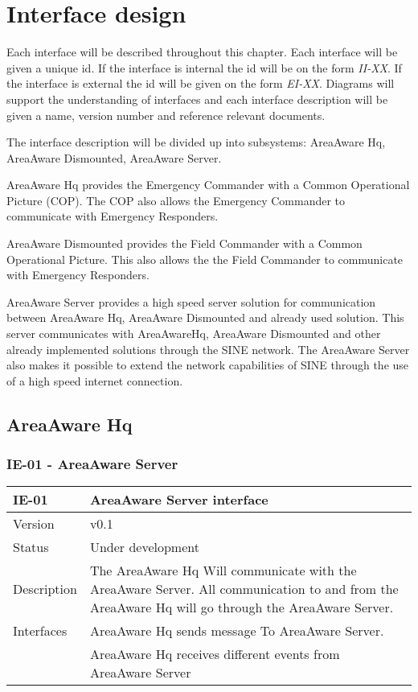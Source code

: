 \label{chp_interfaceDesign}
\chapter{Interface design}
Each interface will be described throughout this chapter. Each interface will be given a unique id. If the interface is internal the id will be on the form \emph{II-XX}. If the interface is external the id will be given on the form \emph{EI-XX}. Diagrams will support the understanding of interfaces and each interface description will be given a name, version number and reference relevant documents.

The interface description will be divided up into subsystems: AreaAware Hq, AreaAware Dismounted, AreaAware Server.

AreaAware Hq provides the Emergency Commander with a Common Operational Picture (COP). The COP also allows the Emergency Commander to communicate with Emergency Responders.

AreaAware Dismounted provides the Field Commander with a Common Operational Picture. This also allows the the Field Commander to communicate with Emergency Responders. 

AreaAware Server provides a high speed server solution for communication between AreaAware Hq, AreaAware Dismounted and already used solution. This server communicates with AreaAwareHq, AreaAware Dismounted and other already implemented solutions through the SINE network. The AreaAware Server also makes it possible to extend the network capabilities of SINE through the use of a high speed internet connection.


\section{AreaAware Hq}

\subsection{IE-01 - AreaAware Server}

\begin{longtable}{| p{3.5cm} |  p{10cm} | }
	\hline
	\textbf{IE-01} &  \textbf{AreaAware Server interface } \\
	\hline
	Version & v0.1 \\
	\hline
	Status & Under development \\
	\hline
	 Description & The AreaAware Hq Will communicate with the AreaAware Server. All communication to and from the AreaAware Hq will go through the AreaAware Server. 
	  \\
	\hline
	 Interfaces & AreaAware Hq sends message To AreaAware Server.  \\
					   & AreaAware Hq receives different events from AreaAware Server  \\
	\hline
\end{longtable}



